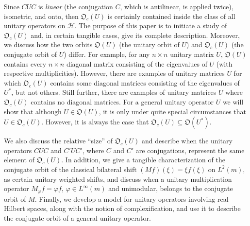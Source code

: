 \documentclass{dis}
\theoremstyle{plain}
\theoremstyle{definition}
\renewcommand{\subset}{\subseteq}
\renewcommand{\phi}{\varphi}
\newcommand{\0}{{\color{lightgray}0}}
\begin{document}
Since $C U C$ is {\em linear} (the conjugation $C$, which is antilinear,  is applied twice), isometric, and onto, then
 $\mathfrak{O}_c(U)$ is certainly contained inside the class of all unitary operators on $\mathcal{H}$. The purpose of this paper is to initiate a study of 
  $\mathfrak{O}_c(U)$ and, in certain tangible cases, give its complete description. Moreover, we discuss how the two orbits $\mathfrak{O}(U)$ (the unitary orbit of $U$) and $\mathfrak{O}_c(U)$ (the conjugate orbit of $U$) differ. For example, for any $n \times n$ unitary matrix $U$, $\mathfrak{O}(U)$ contains every $n \times n$ diagonal matrix consisting of the eigenvalues of $U$ (with respective multiplicities). However, there are examples of unitary matrices $U$ for which $\mathfrak{O}_c(U)$ contains some diagonal matrices consisting of the eigenvalues of $U^{*}$, but not others. Still further, there are examples of unitary matrices $U$ where $\mathfrak{O}_c(U)$ contains no diagonal matrices. For a general unitary operator $U$ we will show that  although $U \in \mathfrak{O}(U)$, it is only under quite special circumstances that $U \in \mathfrak{O}_c(U)$. However, it is always the case that  $\mathfrak{O}_c(U) \subset \mathfrak{O}(U^{*})$. 

We also discuss the relative ``size'' of $\mathfrak{O}_c(U)$ and describe when the unitary operators  $C U C$ and $C' U C'$, where $C$ and $C'$ are conjugations, represent the same element of $\mathfrak{O}_c(U)$. In addition, we give a tangible characterization of the conjugate orbit of the classical bilateral shift $(M f)(\xi) = \xi f(\xi)$ on $L^2(m)$, as certain unitary weighted shifts, and discuss when a unitary multiplication operator $M_{\phi} f = \phi f$, $\phi \in L^{\infty}(m)$ and unimodular, belongs to the conjugate orbit of $M$.  Finally, we develop a model for unitary operators involving real Hilbert spaces, along with the notion of complexification, and use it to describe the conjugate orbit of a general unitary operator. 
\end{document}
